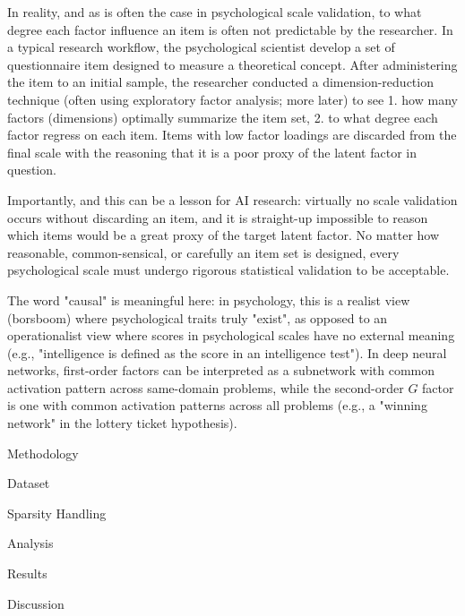 In reality, and as is often the case in psychological scale validation, to what degree each factor influence an item is often not predictable by the researcher. In a typical research workflow, the psychological scientist develop a set of questionnaire item designed to measure a theoretical concept. After administering the item to an initial sample, the researcher conducted a dimension-reduction technique (often using exploratory factor analysis; more later) to see 1. how many factors (dimensions) optimally summarize the item set, 2. to what degree each factor regress on each item. Items with low factor loadings are discarded from the final scale with the reasoning that it is a poor proxy of the latent factor in question.

Importantly, and this can be a lesson for AI research: virtually no scale validation occurs without discarding an item, and it is straight-up impossible to reason which items would be a great proxy of the target latent factor. No matter how reasonable, common-sensical, or carefully an item set is designed, every psychological scale must undergo rigorous statistical validation to be acceptable.

The word "causal" is meaningful here: in psychology, this is a realist view (borsboom) where psychological traits truly "exist", as opposed to an operationalist view where scores in psychological scales have no external meaning (e.g., "intelligence is defined as the score in an intelligence test"). In deep neural networks, first-order factors can be interpreted as a subnetwork with common activation pattern across same-domain problems, while the second-order $G$ factor is one with common activation patterns across all problems (e.g., a "winning network" in the lottery ticket hypothesis).



Methodology


Dataset

Sparsity Handling

Analysis

Results

Discussion